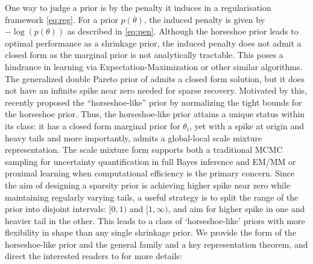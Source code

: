 \documentclass[11pt]{article}
\begin{document}
One way to judge a prior is by the penalty it induces in a regularisation
framework \eqref{eq:reg}. For a prior $p(\theta)$, the induced penalty is
given by $-\log(p(\theta))$ as described in \eqref{eq:pen}. Although the horseshoe prior leads
to optimal performance as a shrinkage prior, the induced penalty does not admit
a closed form as the marginal prior is not analytically tractable. This poses a
hindrance in learning via Expectation-Maximization or other similar algorithms.
The generalized double Pareto prior of \citet{armagan2011generalized} admits a
closed form solution, but it does not have an infinite spike near zero needed
for sparse recovery. Motivated by this, \citet{bhadra2017horseshoe} recently
proposed the ``horseshoe-like'' prior by normalizing the tight bounds for the
horseshoe prior. Thus, the horseshoe-like prior attains a unique status within
its class: it has a closed form marginal prior for $\theta_i$, yet with a spike
at origin and heavy tails and more importantly, admits a global-local scale
mixture representation. The scale mixture form supports both a traditional MCMC
sampling for uncertainty quantification in full Bayes inference and EM/MM or
proximal learning when computational efficiency is the primary concern. Since
the aim of designing a sparsity prior is achieving higher spike near zero while
maintaining regularly varying tails, a useful strategy is to split the range of
the prior into disjoint intervals: $[0,1)$ and $[1, \infty)$, and aim for
higher spike in one and heavier tail in the other. This leads to a class of
`horseshoe-like' priors with more flexibility in shape than any single
shrinkage prior. We provide the form of the horseshoe-like prior and the
general family and a key representation theorem, and direct the interested
readers to \citet{bhadra2017horseshoe} for more details: 
\end{document}
